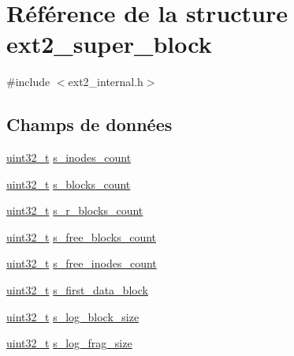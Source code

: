 \hypertarget{structext2__super__block}{\section{Référence de la structure ext2\-\_\-super\-\_\-block}
\label{structext2__super__block}
}


{\ttfamily \#include $<$ext2\-\_\-internal.\-h$>$}

\subsection*{Champs de données}
\begin{DoxyCompactItemize}
\item 
\hyperlink{kernel_2include_2types_8h_a33594304e786b158f3fb30289278f5af}{uint32\-\_\-t} \hyperlink{structext2__super__block_a2ea20f821c0ddc19b0adc7d1b8d0685d}{s\-\_\-inodes\-\_\-count}
\item 
\hyperlink{kernel_2include_2types_8h_a33594304e786b158f3fb30289278f5af}{uint32\-\_\-t} \hyperlink{structext2__super__block_a3878ffaff13c625cce6b825ecb797547}{s\-\_\-blocks\-\_\-count}
\item 
\hyperlink{kernel_2include_2types_8h_a33594304e786b158f3fb30289278f5af}{uint32\-\_\-t} \hyperlink{structext2__super__block_a660db33fc94622167793c6b080c515e4}{s\-\_\-r\-\_\-blocks\-\_\-count}
\item 
\hyperlink{kernel_2include_2types_8h_a33594304e786b158f3fb30289278f5af}{uint32\-\_\-t} \hyperlink{structext2__super__block_a005160872a0474cdc9be97da00b81b84}{s\-\_\-free\-\_\-blocks\-\_\-count}
\item 
\hyperlink{kernel_2include_2types_8h_a33594304e786b158f3fb30289278f5af}{uint32\-\_\-t} \hyperlink{structext2__super__block_aeefbe6028c7e1554805b033287de0097}{s\-\_\-free\-\_\-inodes\-\_\-count}
\item 
\hyperlink{kernel_2include_2types_8h_a33594304e786b158f3fb30289278f5af}{uint32\-\_\-t} \hyperlink{structext2__super__block_ab7c5dfba6eafbb1974f7628d4ae32601}{s\-\_\-first\-\_\-data\-\_\-block}
\item 
\hyperlink{kernel_2include_2types_8h_a33594304e786b158f3fb30289278f5af}{uint32\-\_\-t} \hyperlink{structext2__super__block_a34965ad64787db6bf0893e000b19f608}{s\-\_\-log\-\_\-block\-\_\-size}
\item 
\hyperlink{kernel_2include_2types_8h_a33594304e786b158f3fb30289278f5af}{uint32\-\_\-t} \hyperlink{structext2__super__block_a441780f5356cad879e465bb23d5c0659}{s\-\_\-log\-\_\-frag\-\_\-size}

\end{DoxyCompactItemize}
